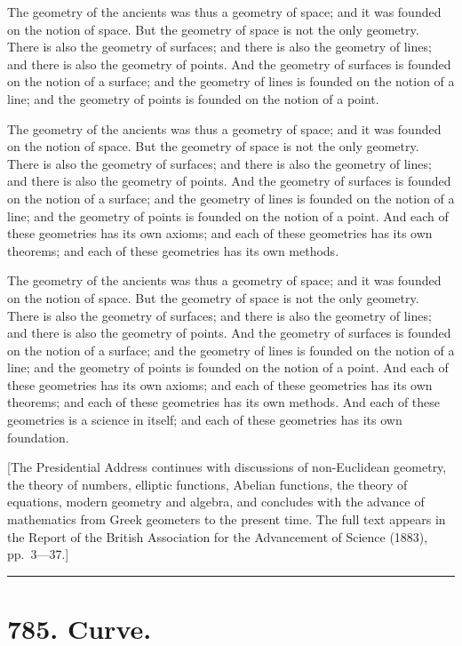\documentclass[11pt,a4paper]{article}
\begin{document}
The geometry of the ancients was thus a geometry of space; and it was
founded on the notion of space. But the geometry of space is not the
only geometry. There is also the geometry of surfaces; and there is
also the geometry of lines; and there is also the geometry of points.
And the geometry of surfaces is founded on the notion of a surface;
and the geometry of lines is founded on the notion of a line; and the
geometry of points is founded on the notion of a point.

The geometry of the ancients was thus a geometry of space; and it was
founded on the notion of space. But the geometry of space is not the
only geometry. There is also the geometry of surfaces; and there is
also the geometry of lines; and there is also the geometry of points.
And the geometry of surfaces is founded on the notion of a surface;
and the geometry of lines is founded on the notion of a line; and the
geometry of points is founded on the notion of a point. And each of
these geometries has its own axioms; and each of these geometries has
its own theorems; and each of these geometries has its own methods.

The geometry of the ancients was thus a geometry of space; and it was
founded on the notion of space. But the geometry of space is not the
only geometry. There is also the geometry of surfaces; and there is
also the geometry of lines; and there is also the geometry of points.
And the geometry of surfaces is founded on the notion of a surface;
and the geometry of lines is founded on the notion of a line; and the
geometry of points is founded on the notion of a point. And each of
these geometries has its own axioms; and each of these geometries has
its own theorems; and each of these geometries has its own methods. And
each of these geometries is a science in itself; and each of these
geometries has its own foundation.

[The Presidential Address continues with discussions of non-Euclidean
geometry, the theory of numbers, elliptic functions, Abelian functions,
the theory of equations, modern geometry and algebra, and concludes with
the advance of mathematics from Greek geometers to the present time.
The full text appears in the Report of the British Association for
the Advancement of Science (1883), pp.~3---37.]

\vspace{12pt}
\hrule
\vspace{12pt}

\section*{785. Curve.}
\end{document}
